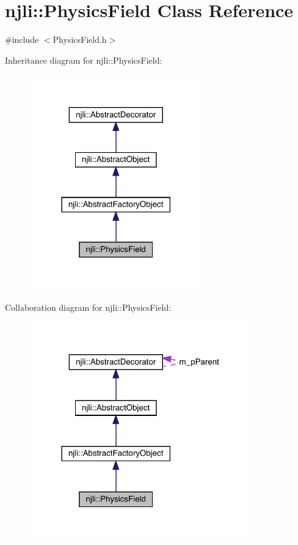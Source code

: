 \hypertarget{classnjli_1_1_physics_field}{}\section{njli\+:\+:Physics\+Field Class Reference}
\label{classnjli_1_1_physics_field}


{\ttfamily \#include $<$Physics\+Field.\+h$>$}



Inheritance diagram for njli\+:\+:Physics\+Field\+:\nopagebreak
\begin{figure}[H]
\begin{center}
\leavevmode
\includegraphics[width=213pt]{classnjli_1_1_physics_field__inherit__graph}
\end{center}
\end{figure}


Collaboration diagram for njli\+:\+:Physics\+Field\+:\nopagebreak
\begin{figure}[H]
\begin{center}
\leavevmode
\includegraphics[width=273pt]{classnjli_1_1_physics_field__coll__graph}
\end{center}
\end{figure}
